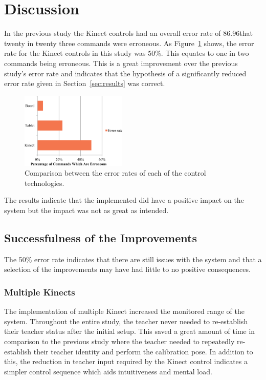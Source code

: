 \documentclass[link]{IWCOMP}
\begin{document}
\section{Discussion}
\label{sec:discussion}


In the previous study the Kinect controls had an overall error rate of 86.96\meaning that twenty in twenty three commands were erroneous.
As Figure~\ref{fig:controlDevicesErrors} shows, the error rate for the Kinect controls in this study was 50\%.
This equates to one in two commands being erroneous.
This is a great improvement over the previous study's error rate and indicates that the hypothesis of a significantly reduced error rate given in Section~\ref{sec:results} was correct.

\begin{figure}[h]
  \centering
  \includegraphics[width=0.45\textwidth]{figures/bar_chart_errors.png}
  \caption{Comparison between the error rates of each of the control technologies.}
  \label{fig:controlDevicesErrors}
\end{figure}

The results indicate that the implemented did have a positive impact on the system but the impact was not as great as intended.

\subsection{Successfulness of the Improvements}
\label{sec:discussionSuccess}

The 50\% error rate indicates that there are still issues with the system and that a selection of the improvements may have had little to no positive consequences.

\subsubsection{Multiple Kinects}
\label{sec:discussionSuccessMultipleKinects}

The implementation of multiple Kinect increased the monitored range of the system.
Throughout the entire study, the teacher never needed to re-establish their teacher status after the initial setup.
This saved a great amount of time in comparison to the previous study where the teacher needed to repeatedly re-establish their teacher identity and perform the calibration pose.
In addition to this, the reduction in teacher input required by the Kinect control indicates a simpler control sequence which aids intuitiveness and mental load.
\end{document}
